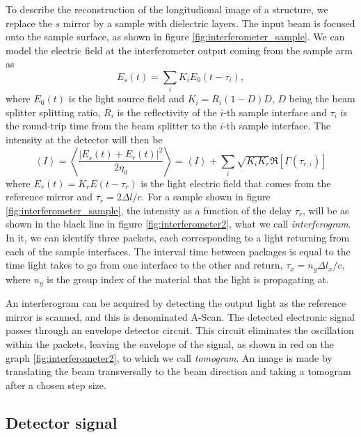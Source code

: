 \documentclass[12pt,twoside,english]{book}
\renewcommand{\~}{\perispomeni}%
\numberwithin{equation}{section}
\numberwithin{figure}{section}
\begin{document}
To describe the reconstruction of the longitudional image of a structure, we replace the $s$ mirror by a sample with dielectric layers. The input beam is focused onto the sample surface, as shown in figure \ref{fig:interferometer_sample}. We can model the electric field at the interferometer output coming from the sample arm as
\begin{equation}
E_{s}\left(t\right)=\sum_{i}K_{i}E_{0}\left(t-\tau_{i}\right),
\end{equation}
where $E_{0}\left(t\right)$ is the light source field and $K_{i}=R_{i}\left(1-D\right)D$, $D$ being the beam splitter splitting ratio, $R_{i}$ is the reflectivity of the $i$-th sample interface and $\tau_{i}$ is the round-trip time from the beam splitter to the $i$-th sample interface. The intensity at the detector will then be
\begin{equation}
\left\langle I\right\rangle =\left\langle \frac{\left|E_{s}\left(t\right)+E_{r}\left(t\right)\right|^{2}}{2\eta_{0}}\right\rangle =\left\langle I\right\rangle +\sum_{i}\sqrt{K_{i}K_{r}}\Re\left[\Gamma\left(\tau_{r,i}\right)\right]\end{equation}
where $E_{r}\left(t\right)=K_{r}E\left(t-\tau_{r}\right)$ is the light electric field that comes from the reference mirror and $\tau_{r}=2\Delta l/c$. For a sample shown in figure \ref{fig:interferometer_sample}, the intensity as a function of the delay $\tau_{r}$, will be as shown in the black line in figure \ref{fig:interferometer2}, what we call \emph{interferogram}. In it, we can identify three packets, each corresponding to a light returning from each of the sample interfaces.
The interval time between packages is equal to the time light takes to go from one interface to the other and return, $\tau_{x}=n_{g}\Delta l_{x}/c$, where $n_{g}$ is the group index of the material that the light is propagating at.

An interferogram can be acquired by detecting the output light as the reference mirror is scanned, and this is denominated A-Scan. The detected electronic signal passes through an envelope detector circuit. This circuit eliminates the oscillation within the packets, leaving the envelope of the signal, as shown in red on the graph \ref{fig:interferometer2}, to which we call \emph{tomogram}. An image is made by translating the beam transversally to the beam direction and taking a tomogram after a chosen step size.


\subsection{Detector signal}
\end{document}
